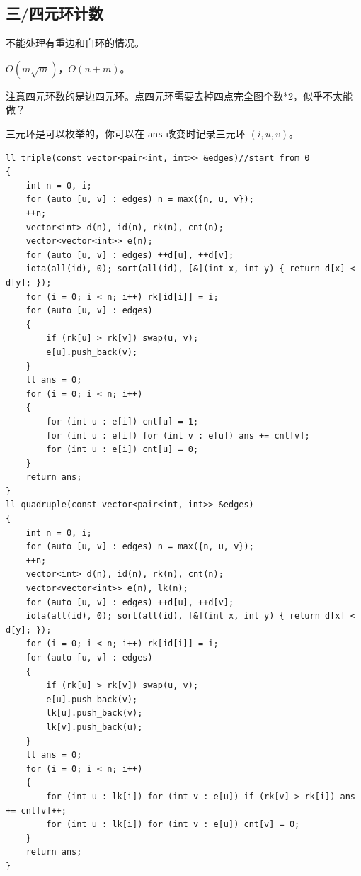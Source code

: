 \documentclass[12pt]{ctexart}
\begin{document}
\subsection{三/四元环计数}

不能处理有重边和自环的情况。

$O(m\sqrt m)$，$O(n+m)$。

注意四元环数的是边四元环。点四元环需要去掉四点完全图个数*2，似乎不太能做？

三元环是可以枚举的，你可以在 \verb|ans| 改变时记录三元环 $(i,u,v)$。

\begin{lstlisting}
ll triple(const vector<pair<int, int>> &edges)//start from 0
{
	int n = 0, i;
	for (auto [u, v] : edges) n = max({n, u, v});
	++n;
	vector<int> d(n), id(n), rk(n), cnt(n);
	vector<vector<int>> e(n);
	for (auto [u, v] : edges) ++d[u], ++d[v];
	iota(all(id), 0); sort(all(id), [&](int x, int y) { return d[x] < d[y]; });
	for (i = 0; i < n; i++) rk[id[i]] = i;
	for (auto [u, v] : edges)
	{
		if (rk[u] > rk[v]) swap(u, v);
		e[u].push_back(v);
	}
	ll ans = 0;
	for (i = 0; i < n; i++)
	{
		for (int u : e[i]) cnt[u] = 1;
		for (int u : e[i]) for (int v : e[u]) ans += cnt[v];
		for (int u : e[i]) cnt[u] = 0;
	}
	return ans;
}
ll quadruple(const vector<pair<int, int>> &edges)
{
	int n = 0, i;
	for (auto [u, v] : edges) n = max({n, u, v});
	++n;
	vector<int> d(n), id(n), rk(n), cnt(n);
	vector<vector<int>> e(n), lk(n);
	for (auto [u, v] : edges) ++d[u], ++d[v];
	iota(all(id), 0); sort(all(id), [&](int x, int y) { return d[x] < d[y]; });
	for (i = 0; i < n; i++) rk[id[i]] = i;
	for (auto [u, v] : edges)
	{
		if (rk[u] > rk[v]) swap(u, v);
		e[u].push_back(v);
		lk[u].push_back(v);
		lk[v].push_back(u);
	}
	ll ans = 0;
	for (i = 0; i < n; i++)
	{
		for (int u : lk[i]) for (int v : e[u]) if (rk[v] > rk[i]) ans += cnt[v]++;
		for (int u : lk[i]) for (int v : e[u]) cnt[v] = 0;
	}
	return ans;
}


\end{lstlisting}
\end{document}
